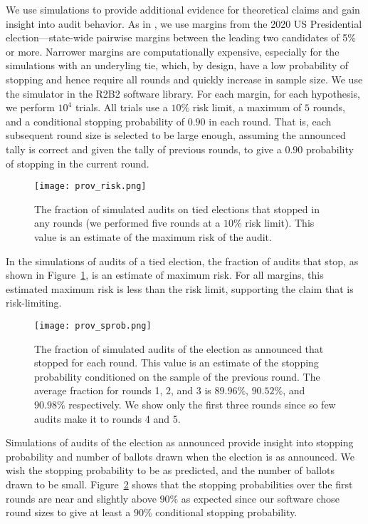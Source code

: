 We use simulations to provide additional evidence for theoretical claims and gain insight into audit behavior. As in \cite{simulations}, we use margins from the 2020 US Presidential election---state-wide pairwise margins between the leading two candidates of 5\% or more. Narrower margins are computationally expensive, especially for the simulations with an underyling tie, which, by design, have a low probability of stopping and hence require all rounds and quickly increase in sample size. We use the simulator in the R2B2 software library\cite{r2b2}. For each margin, for each hypothesis, we perform $10^4$ trials. All trials use a $10\%$ risk limit, a maximum of $5$ rounds, and a conditional stopping probability of $0.90$ in each round. That is, each subsequent round size is selected to be large enough, assuming the announced tally is correct and given the tally of previous rounds, to give a $0.90$ probability of stopping in the current round.

\begin{figure}
\texttt{[image: prov\_risk.png]}
\caption{The fraction of simulated \Providence audits on tied elections that stopped in any rounds (we performed five rounds at a $10\%$ risk limit). This value is an estimate of the maximum risk of the \Providence audit.}
\label{fig:prov-risk}
\end{figure}

In the simulations of \Providence audits of a tied election, the fraction of audits that stop, as shown in Figure~\ref{fig:prov-risk}, is an estimate of maximum risk. For all margins, this estimated maximum risk is less than the risk limit, supporting the claim that \Providence is risk-limiting.

\begin{figure}
\texttt{[image: prov\_sprob.png]}
\caption{The fraction of simulated \Providence audits of the election as announced that stopped for each round. This value is an estimate of the stopping probability conditioned on the sample of the previous round. The average fraction for rounds 1, 2, and 3 is $89.96\%$, $90.52\%$, and $90.98\%$ respectively. We show only the first three rounds since so few audits make it to rounds 4 and 5.}
\label{fig:prov-sprob}
\end{figure}

Simulations of audits of the election as announced provide insight into stopping probability and number of ballots drawn when the election is as announced. We wish the stopping probability to be as predicted, and the number of ballots drawn to be small. Figure~\ref{fig:prov-sprob} shows that the stopping probabilities over the first rounds are near and slightly above $90\%$ as expected since our software chose round sizes to give at least a $90\%$ conditional stopping probability.

